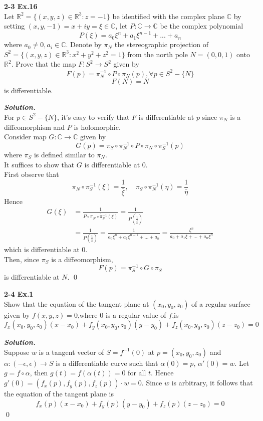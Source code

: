 \documentclass{article}
\begin{document}
\par
\textbf{2-3 Ex.16}\\
Let $\mathbb{R}^2=\{(x,y,z)\in \mathbb{R}^3:z=-1\}$
be identified with the complex plane $\mathbb{C}$
by setting $(x,y,-1)=x+iy=\xi \in \mathbb{C}$,
let $P:\mathbb{C}\to \mathbb{C}$ be the complex
polynomial
$$
P(\xi)=a_0 \xi^n + a_1 \xi^{n-1} + ... + a_n
$$
where $a_0 \neq 0, a_i \in \mathbb{C}$.
Denote by $\pi_N$ the stereographic projection of
$S^2=\{(x,y,z)\in \mathbb{R}^3: x^2+y^2+z^2=1\}$
from the north pole $N=(0,0,1)$ onto $\mathbb{R}^2$.
Prove that the map $F:S^2 \to S^2$ given by
$$
    F(p)=\pi_N^{-1} \circ P \circ \pi_N(p), \forall p \in S^2 - \{N\}
$$
$$
    F(N)=N
$$
is differentiable.

\par
\textbf{\textit{Solution.}}\\
For $p \in S^2-\{N\}$, it's easy to verify that $F$ is 
differentiable at $p$ since $\pi_N$ is a diffeomorphism
and $P$ is holomorphic.\\
Consider map $G: \mathbb{C} \to \mathbb{C}$ given by
$$
    G(p)=\pi_S \circ \pi_N^{-1} \circ P \circ \pi_N \circ \pi_S^{-1}(p)
$$
where $\pi_S$ is defined similar to $\pi_N$.\\
It suffices to show that $G$ is differentiable at $0$.\\
First observe that 
$$
    \pi_N \circ \pi_S^{-1}(\xi)=\frac{1}{\bar{\xi}}, \quad
    \pi_S \circ \pi_N^{-1}(\eta) = \frac{1}{\bar{\eta}}
$$
Hence
$$
\begin{aligned}
    G(\xi)&=\frac{1}{\overline{P\circ \pi_N \circ \pi_S^{-1}(\xi)}}=\frac{1}{\overline{P(\frac{1}{\bar{\xi}})}}\\
    &=\frac{1}{P(\frac{1}{\xi})} = \frac{1}{a_0\xi^n+a_1\xi^{n-1}+...+a_n}=\frac{\xi^n}{a_0+a_1\xi+...+a_n\xi^n}
\end{aligned}
$$
which is differentiable at $0$.\\
Then, since $\pi_S$ is a diffeomorphism,
$$
    F(p) = \pi_S^{-1} \circ G \circ \pi_S
$$
is differentiable at $N$. \qed

\par
\textbf{2-4 Ex.1}\\
Show that the equation of the tangent plane at $(x_0,y_0,z_0)$
of a regular surface given by $f(x,y,z)=0$,where $0$ is a
regular value of $f$,is
$$
    f_x(x_0,y_0,z_0)(x-x_0)+f_y(x_0,y_0,z_0)(y-y_0)+f_z(x_0,y_0,z_0)(z-z_0)=0
$$

\par
\textbf{\textit{Solution.}}\\
Suppose $w$ is a tangent vector of $S=f^{-1}(0)$ at $p=(x_0,y_0,z_0)$
and $\alpha: (-\epsilon, \epsilon) \to S$ is a differentiable
curve such that $\alpha(0)=p$, $\alpha'(0)=w$. Let
$g=f\circ \alpha$, then $g(t)=f(\alpha(t))=0$ for all $t$.
Hence $g'(0)=(f_x(p),f_y(p),f_z(p)) \cdot w = 0$.
Since $w$ is arbitrary, it follows that the equation of the
tangent plane is
$$
    f_x(p)(x-x_0)+f_y(p)(y-y_0)+f_z(p)(z-z_0)=0
$$
\qed
\end{document}

